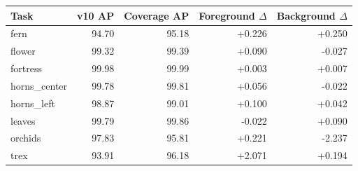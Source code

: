 \begin{tabular}{lrrrr}
\toprule
Task & v10 AP & Coverage AP & Foreground $\Delta$ & Background $\Delta$ \\
\midrule
fern & 94.70 & 95.18 & +0.226 & +0.250 \\
flower & 99.32 & 99.39 & +0.090 & -0.027 \\
fortress & 99.98 & 99.99 & +0.003 & +0.007 \\
horns\_center & 99.78 & 99.81 & +0.056 & -0.022 \\
horns\_left & 98.87 & 99.01 & +0.100 & +0.042 \\
leaves & 99.79 & 99.86 & -0.022 & +0.090 \\
orchids & 97.83 & 95.81 & +0.221 & -2.237 \\
trex & 93.91 & 96.18 & +2.071 & +0.194 \\
\bottomrule
\end{tabular}
